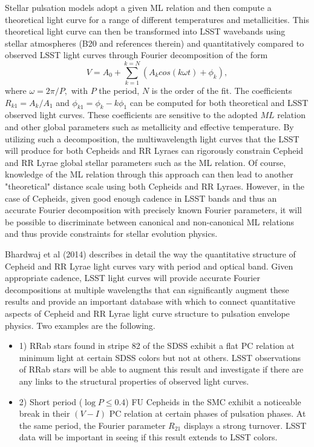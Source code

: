 Stellar pulsation models adopt a given ML relation and then compute a theoretical light curve for a range of
different temperatures and metallicities. This theoretical light curve can then be transformed into LSST wavebands using
stellar atmospheres (B20 and references therein) and quantitatively compared to observed LSST light curves through Fourier decomposition of the
form
$$V = A_0 + \sum_{k=1}^{k=N}(A_k cos(k\omega t) + {\phi}_k),$$
where $\omega = 2\pi/P,$ with $P$ the period, $N$ is the order of the fit. The coefficients $R_{k1}=A_k/A_1$ and 
${\phi}_{k1}={\phi}_k - k{\phi}_1$ can be computed for both theoretical and LSST observed light curves. These coefficients
are sensitive to the adopted $ML$ relation and other global parameters such as metallicity and effective temperature.
By utilizing such a decomposition,
the multiwavelength light curves that the LSST will produce for both Cepheids and RR Lyraes can rigorously constrain Cepheid and RR
Lyrae global stellar parameters such as the ML relation. Of course, knowledge of the ML relation through this approach can then
lead to another "theoretical" distance scale using both Cepheids and RR Lyraes. 
However, in the case of Cepheids, given good enough cadence in LSST bands and thus an accurate Fourier decomposition with precisely known
Fourier parameters, it will be possible to discriminate between canonical and non-canonical ML relations and thus provide constraints
for stellar evolution physics.

Bhardwaj et al (2014) describes in detail the way the quantitative structure of Cepheid and RR Lyrae light curves vary with
period and optical band. Given appropriate cadence, LSST light curves will provide accurate Fourier decompositions at multiple 
wavelengths that can significantly augment these results and provide an important database with which to connect quantitative
aspects of Cepheid and RR Lyrae light curve structure to pulsation envelope physics. Two examples are the following.
\begin{itemize}
\item{1)} RRab stars found in stripe 82 of the
SDSS exhibit a flat PC relation at minimum light at certain SDSS colors but not at others. LSST observations of RRab stars will be able
to augment this result and investigate if there are any links to the structural properties of observed light curves.
\item{2)} Short period ($\log P \le 0.4$) FU Cepheids in the SMC exhibit a noticeable break in their $(V-I)$ PC relation at certain phases of pulsation
phases. At the same period, the Fourier parameter $R_{21}$ displays a strong turnover. LSST data will be important in seeing if this result extends 
to LSST colors.
\end{itemize}

